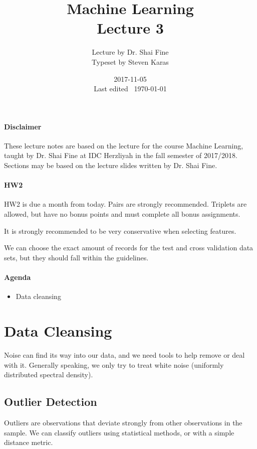 \documentclass{idc_msc}
\title{Machine Learning\\\large Lecture 3}
\date{2017-11-05 \\ Last edited \currenttime\ \today}
\author{Lecture by Dr. Shai Fine\\Typeset by Steven Karas}
\begin{document}
\maketitle

\paragraph{Disclaimer}

These lecture notes are based on the lecture for the course Machine Learning, taught by Dr. Shai Fine at IDC Herzliyah in the fall semester of 2017/2018.
Sections may be based on the lecture slides written by Dr. Shai Fine.

\paragraph{HW2}

HW2 is due a month from today.
Pairs are strongly recommended.
Triplets are allowed, but have no bonus points and must complete all bonus assignments.

It is strongly recommended to be very conservative when selecting features.

We can choose the exact amount of records for the test and cross validation data sets, but they should fall within the guidelines.

\paragraph{Agenda}

\begin{itemize}
  \item Data cleansing
\end{itemize}

\section{Data Cleansing}

Noise can find its way into our data, and we need tools to help remove or deal with it.
Generally speaking, we only try to treat white noise (uniformly distributed spectral density).

\subsection{Outlier Detection}

Outliers are observations that deviate strongly from other observations in the sample.
We can classify outliers using statistical methods, or with a simple distance metric.
\end{document}
